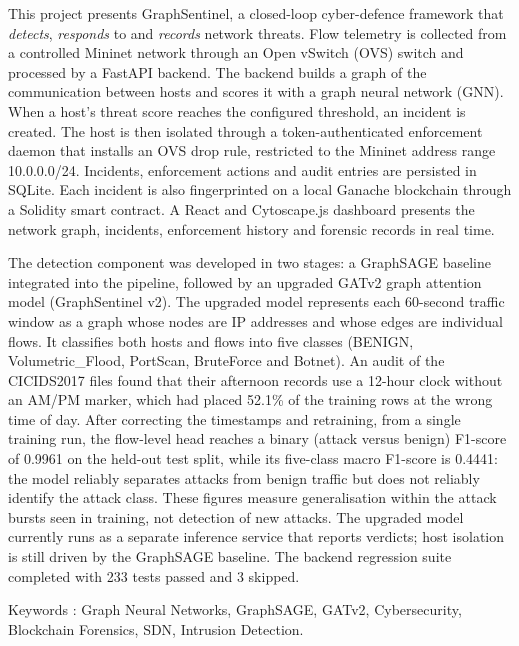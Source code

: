 \documentclass[12pt,a4paper]{report}
\begin{document}
This project presents GraphSentinel, a closed-loop cyber-defence framework that \emph{detects}, \emph{responds} to and \emph{records} network threats. Flow telemetry is collected from a controlled Mininet network through an Open vSwitch (OVS) switch and processed by a FastAPI backend. The backend builds a graph of the communication between hosts and scores it with a graph neural network (GNN). When a host's threat score reaches the configured threshold, an incident is created. The host is then isolated through a token-authenticated enforcement daemon that installs an OVS drop rule, restricted to the Mininet address range 10.0.0.0/24. Incidents, enforcement actions and audit entries are persisted in SQLite. Each incident is also fingerprinted on a local Ganache blockchain through a Solidity smart contract. A React and Cytoscape.js dashboard presents the network graph, incidents, enforcement history and forensic records in real time.

The detection component was developed in two stages: a GraphSAGE baseline integrated into the pipeline, followed by an upgraded GATv2 graph attention model (GraphSentinel v2). The upgraded model represents each 60-second traffic window as a graph whose nodes are IP addresses and whose edges are individual flows. It classifies both hosts and flows into five classes (BENIGN, Volumetric\_Flood, PortScan, BruteForce and Botnet). An audit of the CICIDS2017 files found that their afternoon records use a 12-hour clock without an AM/PM marker, which had placed 52.1\% of the training rows at the wrong time of day. After correcting the timestamps and retraining, from a single training run, the flow-level head reaches a binary (attack versus benign) F1-score of 0.9961 on the held-out test split, while its five-class macro F1-score is 0.4441: the model reliably separates attacks from benign traffic but does not reliably identify the attack class. These figures measure generalisation within the attack bursts seen in training, not detection of new attacks. The upgraded model currently runs as a separate inference service that reports verdicts; host isolation is still driven by the GraphSAGE baseline. The backend regression suite completed with 233 tests passed and 3 skipped.

Keywords : Graph Neural Networks, GraphSAGE, GATv2, Cybersecurity, Blockchain Forensics, SDN, Intrusion Detection.

\end{document}
